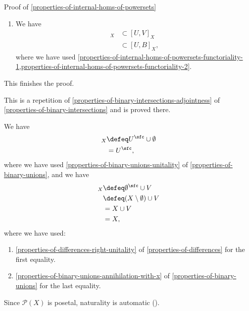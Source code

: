 \begin{Proof}{Proof of \cref{properties-of-internal-homs-of-powersets}}
\begin{enumerate}
        \item\label{proof-of-properties-of-internal-homs-of-powersets-3}We have
            \begin{align*}
                [A,V]_{X} &\subset [U,V]_{X}\\
                          &\subset [U,B]_{X},
            \end{align*}
            where we have used \cref{properties-of-internal-homs-of-powersets-functoriality-1,properties-of-internal-homs-of-powersets-functoriality-2}.
    \end{enumerate}
    This finishes the proof.

    This is a repetition of \cref{properties-of-binary-intersections-adjointness} of \cref{properties-of-binary-intersections} and is proved there.

    We have
    \begin{align*}
        [U,\emptyset]_{X} &\defeq U^{\sfc}\cup\emptyset\\
                          &=      U^{\sfc},
    \end{align*}
    where we have used \cref{properties-of-binary-unions-unitality} of \cref{properties-of-binary-unions}, and we have
    \begin{align*}
        [\emptyset,V]_{X} &\defeq \emptyset^{\sfc}\cup V\\
                          &\defeq (X\setminus\emptyset)\cup V\\
                          &=      X\cup V\\
                          &=      X,
    \end{align*}
    where we have used:
    \begin{enumerate}
        \item\label{proof-of-properties-of-internal-homs-of-powersets-interaction-with-the-empty-set-1-a}\cref{properties-of-differences-right-unitality} of \cref{properties-of-differences} for the first equality.
        \item\label{proof-of-properties-of-internal-homs-of-powersets-interaction-with-the-empty-set-1-b}\cref{properties-of-binary-unions-annihilation-with-x} of \cref{properties-of-binary-unions} for the last equality.
    \end{enumerate}
    Since $\mathcal{P}(X)$ is posetal, naturality is automatic ().


\end{Proof}
